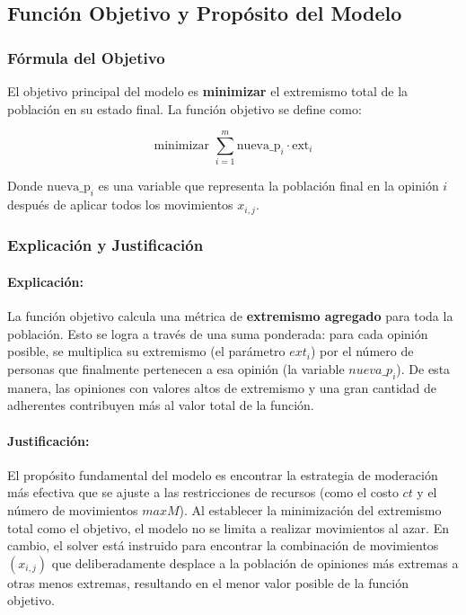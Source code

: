 \documentclass[11pt,letter]{article}
\begin{document}
\subsection{Función Objetivo y Propósito del Modelo}

\subsubsection{Fórmula del Objetivo}
El objetivo principal del modelo es \textbf{minimizar} el extremismo total de la población en su estado final. La función objetivo se define como:

$$
\text{minimizar } \sum_{i=1}^{m} \text{nueva\_p}_i \cdot \text{ext}_i
$$

Donde $\text{nueva\_p}_i$ es una variable que representa la población final en la opinión $i$ después de aplicar todos los movimientos $x_{i,j}$.

\subsubsection{Explicación y Justificación}

\paragraph{Explicación:} 
La función objetivo calcula una métrica de \textbf{extremismo agregado} para toda la población. Esto se logra a través de una suma ponderada: para cada opinión posible, se multiplica su extremismo (el parámetro $ext_i$) por el número de personas que finalmente pertenecen a esa opinión (la variable $nueva\_p_i$). De esta manera, las opiniones con valores altos de extremismo y una gran cantidad de adherentes contribuyen más al valor total de la función.

\paragraph{Justificación:}
El propósito fundamental del modelo es encontrar la estrategia de moderación más efectiva que se ajuste a las restricciones de recursos (como el costo $ct$ y el número de movimientos $maxM$). Al establecer la minimización del extremismo total como el objetivo, el modelo no se limita a realizar movimientos al azar. En cambio, el solver está instruido para encontrar la combinación de movimientos $(x_{i,j})$ que deliberadamente desplace a la población de opiniones más extremas a otras menos extremas, resultando en el menor valor posible de la función objetivo.
\end{document}
